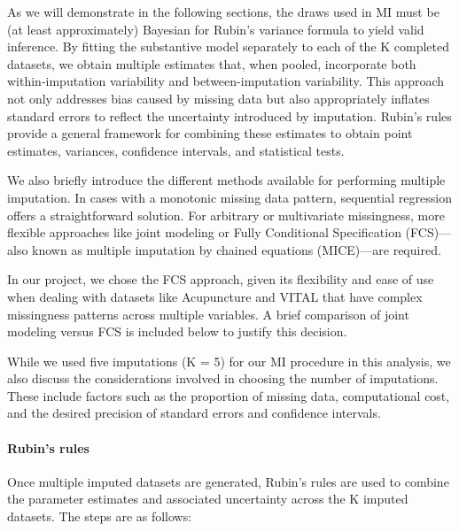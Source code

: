 \documentclass{article}
\begin{document}
As we will demonstrate in the following sections, the draws used in MI
must be (at least approximately) Bayesian for Rubin's variance formula
to yield valid inference. By fitting the substantive model separately to
each of the K completed datasets, we obtain multiple estimates that,
when pooled, incorporate both within-imputation variability and
between-imputation variability. This approach not only addresses bias
caused by missing data but also appropriately inflates standard errors
to reflect the uncertainty introduced by imputation. Rubin's rules
provide a general framework for combining these estimates to obtain
point estimates, variances, confidence intervals, and statistical tests.

We also briefly introduce the different methods available for performing
multiple imputation. In cases with a monotonic missing data pattern,
sequential regression offers a straightforward solution. For arbitrary
or multivariate missingness, more flexible approaches like joint
modeling or Fully Conditional Specification (FCS)---also known as
multiple imputation by chained equations (MICE)---are required.

In our project, we chose the FCS approach, given its flexibility and
ease of use when dealing with datasets like Acupuncture and VITAL that
have complex missingness patterns across multiple variables. A brief
comparison of joint modeling versus FCS is included below to justify
this decision.

While we used five imputations (K = 5) for our MI procedure in this
analysis, we also discuss the considerations involved in choosing the
number of imputations. These include factors such as the proportion of
missing data, computational cost, and the desired precision of standard
errors and confidence intervals.

\paragraph{Rubin's rules}\label{rubins-rules}

Once multiple imputed datasets are generated, Rubin's rules are used to
combine the parameter estimates and associated uncertainty across the K
imputed datasets. The steps are as follows:
\end{document}
